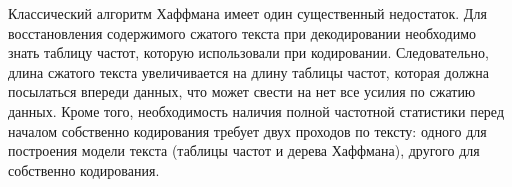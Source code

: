 Классический алгоритм Хаффмана имеет один существенный недостаток. Для восстановления содержимого сжатого текста при декодировании необходимо знать таблицу частот, которую использовали при кодировании. Следовательно, длина сжатого текста увеличивается на длину таблицы частот, которая должна посылаться впереди данных, что может свести на нет все усилия по сжатию данных. Кроме того, необходимость наличия полной частотной статистики перед началом собственно кодирования требует двух проходов по тексту: одного для построения модели текста (таблицы частот и дерева Хаффмана), другого для собственно кодирования.
